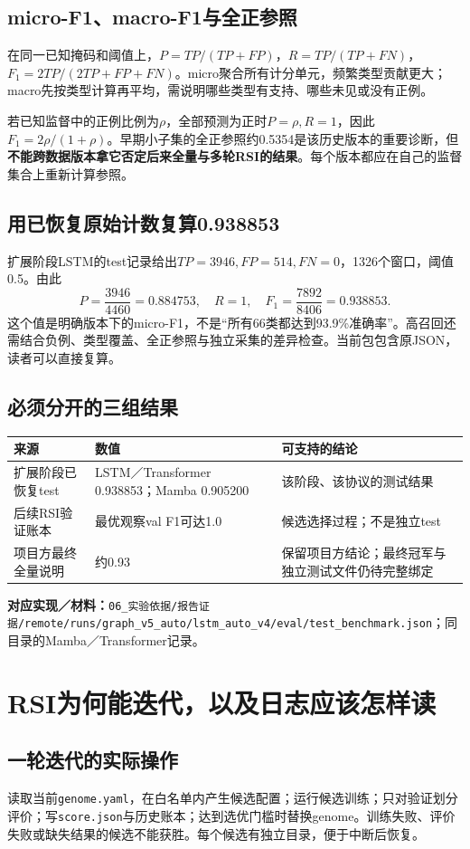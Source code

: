 \documentclass[11pt,a4paper,UTF8,fontset=fandol]{ctexart}
\newcommand{\code}[1]{{\small\nolinkurl{#1}}}
\newcommand{\where}[1]{\par{\small\color{green}\textbf{对应实现／材料：}#1}\par}
\begin{document}
\subsection{micro-F1、macro-F1与全正参照}
在同一已知掩码和阈值上，$P=TP/(TP+FP)$，$R=TP/(TP+FN)$，$F_1=2TP/(2TP+FP+FN)$。micro聚合所有计分单元，频繁类型贡献更大；macro先按类型计算再平均，需说明哪些类型有支持、哪些未见或没有正例。

若已知监督中的正例比例为$\rho$，全部预测为正时$P=\rho,R=1$，因此$F_1=2\rho/(1+\rho)$。早期小子集的全正参照约0.5354是该历史版本的重要诊断，但\textbf{不能跨数据版本拿它否定后来全量与多轮RSI的结果}。每个版本都应在自己的监督集合上重新计算参照。

\subsection{用已恢复原始计数复算0.938853}
扩展阶段LSTM的test记录给出$TP=3946,FP=514,FN=0$，1326个窗口，阈值0.5。由此
\[
P=\frac{3946}{4460}=0.884753,\quad R=1,\quad
F_1=\frac{7892}{8406}=0.938853.
\]
这个值是明确版本下的micro-F1，不是“所有66类都达到93.9\%准确率”。高召回还需结合负例、类型覆盖、全正参照与独立采集的差异检查。当前包包含原JSON，读者可以直接复算。

\subsection{必须分开的三组结果}
\begin{tabularx}{\linewidth}{p{3.1cm}p{2.5cm}X}
\toprule 来源 & 数值 & 可支持的结论\\\midrule
扩展阶段已恢复test & LSTM／Transformer 0.938853；Mamba 0.905200 & 该阶段、该协议的测试结果\\
后续RSI验证账本 & 最优观察val F1可达1.0 & 候选选择过程；不是独立test\\
项目方最终全量说明 & 约0.93 & 保留项目方结论；最终冠军与独立测试文件仍待完整绑定\\
\bottomrule
\end{tabularx}
\where{\code{06_实验依据/报告证据/remote/runs/graph_v5_auto/lstm_auto_v4/eval/test_benchmark.json}；同目录的Mamba／Transformer记录。}

\section{RSI为何能迭代，以及日志应该怎样读}
\subsection{一轮迭代的实际操作}
读取当前\code{genome.yaml}，在白名单内产生候选配置；运行候选训练；只对验证划分评价；写\code{score.json}与历史账本；达到选优门槛时替换genome。训练失败、评价失败或缺失结果的候选不能获胜。每个候选有独立目录，便于中断后恢复。
\end{document}
